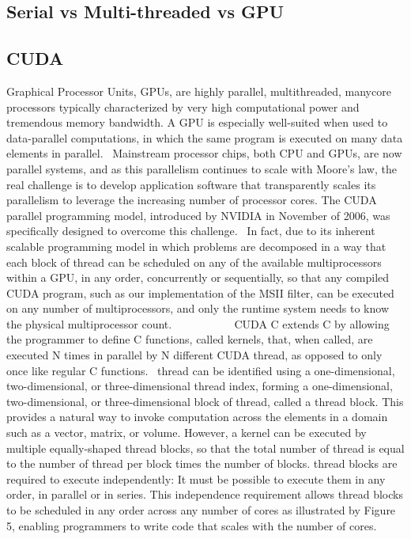 \documentclass{article}
\begin{document}
\subsection{Serial vs Multi-threaded vs GPU}
\subsection{CUDA}
Graphical Processor Units, GPUs, are highly parallel, multithreaded, manycore processors typically characterized by very high computational power and tremendous memory bandwidth. A GPU is especially well-suited when used to data-parallel computations, in which the same program is executed on many data elements in parallel.~\cite[p.~1.1]{CUDA18}
Mainstream processor chips, both CPU and GPUs, are now parallel systems, and as this parallelism continues to scale with Moore's law, the real challenge is to develop application software that transparently scales its parallelism to leverage the increasing number of processor cores. The CUDA parallel programming model, introduced by NVIDIA in November of 2006, was specifically designed to overcome this challenge.~\cite[p.~1.3]{CUDA18}
In fact, due to its inherent scalable programming model in which problems are decomposed in a way that each block of thread can be scheduled on any of the available multiprocessors within a GPU, in any order, concurrently or sequentially, so that any compiled CUDA program, such as our implementation of the MSII filter, can be executed on any number of multiprocessors, and only the runtime system needs to know the physical multiprocessor count.~\cite[p.~1.3]{CUDA18}
~~~~~~~~~
CUDA C extends C by allowing the programmer to define C functions, called kernels, that, when called, are executed N times in parallel by N different CUDA thread, as opposed to only once like regular C functions.~\cite[p.~2.1]{CUDA18}
thread can be identified using a one-dimensional, two-dimensional, or three-dimensional thread index, forming a one-dimensional, two-dimensional, or three-dimensional block of thread, called a thread block. This provides a natural way to invoke computation across the elements in a domain such as a vector, matrix, or volume. However, a kernel can be executed by multiple equally-shaped thread blocks, so that the total number of thread is equal to the number of thread per block times the number of blocks. thread blocks are required to execute independently: It must be possible to execute them in any order, in parallel or in series. This independence requirement allows thread blocks to be scheduled in any order across any number of cores as illustrated by Figure 5, enabling programmers to write code that scales with the number of cores.~\cite[p.~2.2]{CUDA18}
\end{document}
